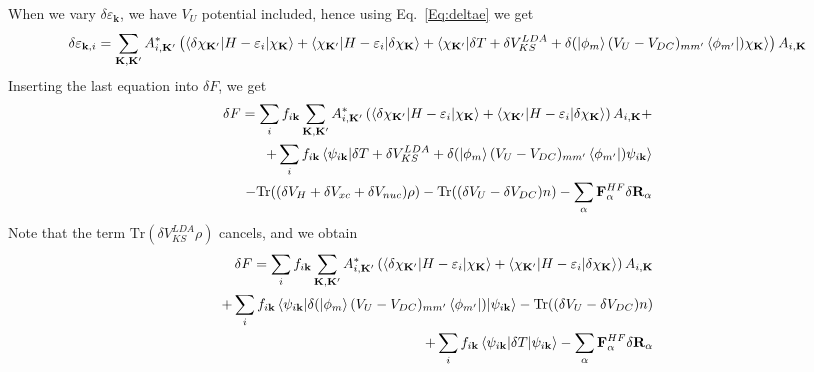 \documentclass[aps,prb,floatfix,epsfig,singlecolumn,showpacs,preprintnumbers]{revtex4}
\newcommand{\vR}{{\mathbf{R}}}
\newcommand{\vF}{{\mathbf{F}}}
\newcommand{\vk}{{\mathbf{k}}}
\newcommand{\vK}{{\mathbf{K}}}
\newcommand{\Tr}{\mathrm{Tr}}
\begin{document}
When we vary $\delta \varepsilon_\vk$, we have $V_U$ potential
included, hence using Eq.~\ref{Eq:deltae} we get
\begin{eqnarray}
\delta \varepsilon_{\vk,i}=
\sum_{\vK,\vK'} A_{i,\vK'}^* \left(
\braket{\delta
  \chi_{\vK'}|H-\varepsilon_i|\chi_{\vK}}+\braket{\chi_{\vK'}|H-\varepsilon_i|\delta\chi_{\vK}}+\braket{\chi_{\vK'}|\delta
  T + \delta V_{KS}^{LDA} + \delta (\ket{\phi_m}(V_U-V_{DC})_{mm'}\bra{\phi_{m'}}) \chi_{\vK}}
\right)A_{i,\vK}
\end{eqnarray}
Inserting the last equation into $\delta F$, we get
\begin{eqnarray}
\delta F = 
\sum_{i} f_{i\vk} \sum_{\vK,\vK'}
A_{i,\vK'}^* 
\left(
\braket{\delta  \chi_{\vK'}|H-\varepsilon_i|\chi_{\vK}}+\braket{\chi_{\vK'}|H-\varepsilon_i|\delta\chi_{\vK}}
\right)A_{i,\vK}+\\
+\sum_i f_{i\vk}\braket{\psi_{i\vk}|\delta  T + \delta V_{KS}^{LDA} + \delta (\ket{\phi_m}(V_U-V_{DC})_{mm'}\bra{\phi_{m'}}) \psi_{i\vk}}
\nonumber\\
-\Tr((\delta V_H+\delta  V_{xc}+\delta V_{nuc})\rho)-\Tr((\delta V_U-\delta V_{DC}) n)
-\sum_\alpha\vF^{HF}_\alpha\delta \vR_\alpha\nonumber
\end{eqnarray}
Note that the term $\Tr(\delta V_{KS}^{LDA}\rho)$ cancels, and we obtain
\begin{eqnarray}
\delta F = 
\sum_{i} f_{i\vk} \sum_{\vK,\vK'}
A_{i,\vK'}^* 
\left(
\braket{\delta  \chi_{\vK'}|H-\varepsilon_i|\chi_{\vK}}+\braket{\chi_{\vK'}|H-\varepsilon_i|\delta\chi_{\vK}}
\right)A_{i,\vK}
\label{Eq:180}\\
+\sum_i f_{i\vk}\braket{\psi_{i\vk}| \delta (\ket{\phi_m}(V_U-V_{DC})_{mm'}\bra{\phi_{m'}})| \psi_{i\vk}}
-\Tr((\delta V_U-\delta V_{DC}) n)
\label{Eq:181}\\
+\sum_i f_{i\vk}\braket{\psi_{i\vk}|\delta  T|\psi_{i\vk}}
-\sum_\alpha\vF^{HF}_\alpha\delta \vR_\alpha 
\end{eqnarray}
\end{document}
